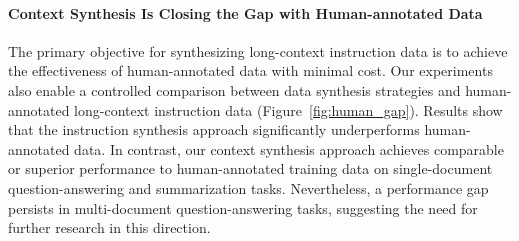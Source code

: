 \noindent\paragraph{Context Synthesis Is Closing the Gap with Human-annotated Data}
The primary objective for synthesizing long-context instruction data is to achieve the effectiveness of human-annotated data with minimal cost.
Our experiments also enable a controlled comparison between data synthesis strategies and human-annotated long-context instruction data (Figure~\ref{fig:human_gap}).
Results show that the instruction synthesis approach significantly underperforms human-annotated data.
In contrast, our context synthesis approach achieves comparable or superior performance to human-annotated training data on single-document question-answering and summarization tasks.
Nevertheless, a performance gap persists in multi-document question-answering tasks, suggesting the need for further research in this direction.